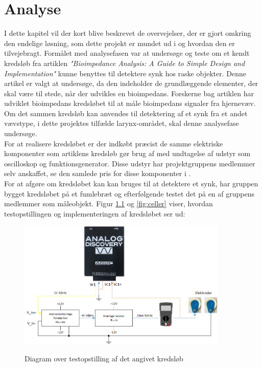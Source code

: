\chapter{Analyse}

 
I dette kapitel vil der kort blive beskrevet de overvejelser, der er gjort omkring den endelige løsning, som dette projekt er mundet ud i og hvordan den er tilvejebragt. Formålet med analysefasen var  at undersøge og teste om et kendt kredsløb fra artiklen \textit{"Bioimpedance Analysis: A Guide to Simple Design and Implementation"} kunne benyttes til detektere synk hos raske objekter. Denne artikel er valgt at undersøge, da den indeholder de grundlæggende elementer, der skal være til stede, når der udvikles en bioimpedans. Forskerne bag artiklen har udviklet bioimpedans kredsløbet til at måle bioimpedans signaler fra hjernevæv.  Om det sammen kredsløb kan anvendes til detektering af et synk fra et andet vævstype, i dette projektes tilfælde larynx-området, skal denne analysefase undersøge. \\

For at realisere kredsløbet er der indkøbt præcist de samme elektriske komponenter som artiklens kredsløb gør brug af med undtagelse af udstyr som oscilloskop og funktionsgenerator. Disse udstyr har projektgruppens medlemmer selv anskaffet, se den samlede pris for disse komponenter i . \\

For at afgøre om kredsløbet kan kan bruges til at detektere et synk, har gruppen bygget kredsløbet på et fumlebræt og efterfølgende testet det på en af gruppens medlemmer som måleobjekt. Figur \ref{fig:testopstilling1} og \ref{fig:celler} viser, hvordan testopstillingen og implementeringen af kredsløbet ser ud:

\begin{figure}[H]
\centering
{\includegraphics[width=10cm]
{Figure/testopstilling11}}
\caption{Diagram over testopstilling af det angivet kredsløb}
\label{fig:testopstilling1}
\end{figure} 



